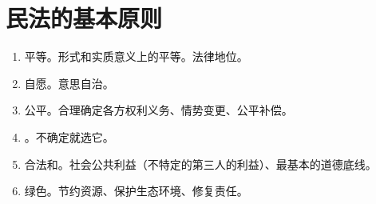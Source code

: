 \section{民法的基本原则}
\begin{enumerate}
  \item 平等。形式和实质意义上的平等。法律地位。
  \item 自愿。意思自治。
  \item 公平。合理确定各方权利义务、情势变更、公平补偿。
  \item {}。不确定就选它。
  \item 合法和。社会公共利益（不特定的第三人的利益）、最基本的道德底线。
  \item 绿色。节约资源、保护生态环境、修复责任。
\end{enumerate}
